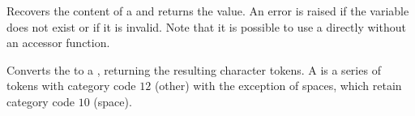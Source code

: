 \documentclass[oneside]{book}
\let\tn=\cs
\begin{document}
\begin{function}{\TlUse}
\begin{syntax}
 
\end{syntax}
Recovers the content of a  and returns the value.
An error is raised if the variable
does not exist or if it is invalid. Note that it is possible to use
a  directly without an accessor function.
\begin{codehigh}
\TlUse \lTmpbTl
\end{codehigh}
\end{function}

\begin{function}{\TlToStr}
\begin{syntax}
 
\end{syntax}
Converts the  to a , returning the
resulting character tokens. A 
is a series of tokens with category code $12$ (other) with the exception
of spaces, which retain category code $10$ (space).
\begin{demohigh}
\end{demohigh}
\end{function}
\end{document}
